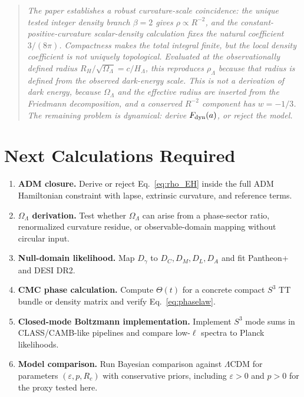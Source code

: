 \documentclass[11pt,a4paper]{article}
\newcommand{\RH}{R_H}
\newcommand{\OmL}{\Omega_\Lambda}
\begin{document}
\begin{quote}
\itshape
The paper establishes a robust curvature-scale coincidence: the unique tested
integer density branch $\beta=2$ gives $\rho\propto R^{-2}$, and the
constant-positive-curvature scalar-density calculation fixes the natural coefficient
$3/(8\pi)$.  Compactness makes the total integral finite, but the local density
coefficient is not uniquely topological.  Evaluated at the observationally defined
radius $\RH/\sqrt{\OmL}=c/H_\Lambda$, this reproduces $\rho_\Lambda$ because that
radius is defined from the observed dark-energy scale.  This is not a derivation
of dark energy, because $\OmL$ and the effective radius are inserted from the
Friedmann decomposition, and a conserved $R^{-2}$ component has $w=-1/3$.  The
remaining problem is dynamical: derive $F_{\rm dyn}(a)$, or reject the model.
\end{quote}

\section{Next Calculations Required}
\label{sec:next}

\begin{enumerate}[leftmargin=1.5em,itemsep=3pt]
\item \textbf{ADM closure.}  Derive or reject Eq.~\eqref{eq:rho_EH} inside the
full ADM Hamiltonian constraint with lapse, extrinsic curvature, and reference terms.
\item \textbf{$\OmL$ derivation.}  Test whether $\OmL$ can arise from a phase-sector
ratio, renormalized curvature residue, or observable-domain mapping without
circular input.
\item \textbf{Null-domain likelihood.}  Map $D_\gamma$ to $D_C,D_M,D_L,D_A$ and fit
Pantheon+ and DESI DR2.
\item \textbf{CMC phase calculation.}  Compute $\Theta(t)$ for a concrete compact
$S^3$ TT bundle or density matrix and verify Eq.~\eqref{eq:phaselaw}.
\item \textbf{Closed-mode Boltzmann implementation.}  Implement $S^3$ mode sums in
CLASS/CAMB-like pipelines and compare low-$\ell$ spectra to Planck likelihoods.
\item \textbf{Model comparison.}  Run Bayesian comparison against $\Lambda$CDM for
parameters $(\varepsilon,p,R_c)$ with conservative priors, including $\varepsilon>0$ and $p>0$ for the proxy tested here.
\end{enumerate}

\appendix
\end{document}
